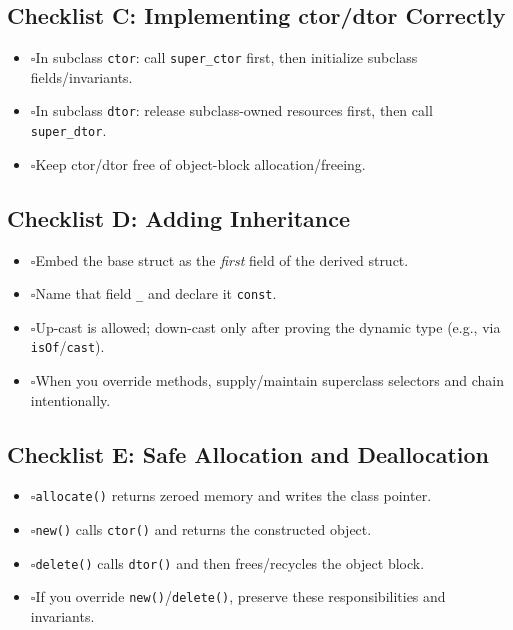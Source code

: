 \documentclass[11pt]{article}
\newcommand{\cb}{\(\square\)}
\begin{document}
\subsection{Checklist C: Implementing ctor/dtor Correctly}

\begin{itemize}
  \item \cb In subclass \texttt{ctor}: call \texttt{super\_ctor} first, then initialize subclass fields/invariants.
  \item \cb In subclass \texttt{dtor}: release subclass-owned resources first, then call \texttt{super\_dtor}.
  \item \cb Keep ctor/dtor free of object-block allocation/freeing.
\end{itemize}

\subsection{Checklist D: Adding Inheritance}

\begin{itemize}
  \item \cb Embed the base struct as the \emph{first} field of the derived struct.
  \item \cb Name that field \texttt{\_} and declare it \texttt{const}.
  \item \cb Up-cast is allowed; down-cast only after proving the dynamic type (e.g., via \texttt{isOf}/\texttt{cast}).
  \item \cb When you override methods, supply/maintain superclass selectors and chain intentionally.
\end{itemize}

\subsection{Checklist E: Safe Allocation and Deallocation}

\begin{itemize}
  \item \cb \texttt{allocate()} returns zeroed memory and writes the class pointer.
  \item \cb \texttt{new()} calls \texttt{ctor()} and returns the constructed object.
  \item \cb \texttt{delete()} calls \texttt{dtor()} and then frees/recycles the object block.
  \item \cb If you override \texttt{new()}/\texttt{delete()}, preserve these responsibilities and invariants.
\end{itemize}
\end{document}
